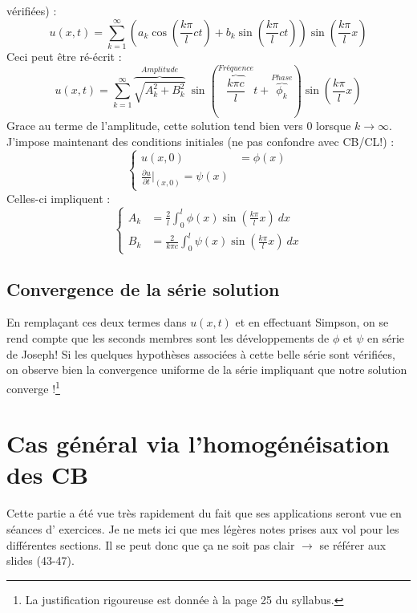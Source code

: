 \documentclass	[11pt, a4paper, openany]{book}
\newcommand{\serie}{\sum_{k=1}^\infty}
\begin{document}
				vérifiées) :
				\begin{equation}
					u(x,t) = \serie\left(a_k\cos\left(\frac{k\pi}{l}ct\right)+b_k\sin\left(\frac{k\pi}{l}ct\right)
					\right)\sin\left(\frac{k\pi}{l}x\right)
				\end{equation}
				Ceci peut être ré-écrit :
				\begin{equation}
					u(x,t) = \serie \overbrace{\sqrt{A_k^2 + B_k^2}}^{Amplitude}\ \sin\left(\overbrace{
						\frac{k\pi c}{l}}^{Fréquence}t +\overbrace{\phi_k}^{Phase}\right)\sin\left(\frac{k\pi}{l}
					x\right)
				\end{equation}
				Grace au terme de l'amplitude, cette solution tend bien vers 0 lorsque $k\rightarrow\infty$.\\
				J'impose maintenant des conditions initiales (ne pas confondre avec CB/CL!) :
				\begin{equation}
					\left\{\begin{array}{ll}
					u(x,0) &= \phi(x)\\
					\frac{\partial u}{\partial t}|_{(x,0)} = \psi(x)
					\end{array}\right.
				\end{equation}
				Celles-ci impliquent :
				\begin{equation}
					\left\{\begin{array}{ll}
					A_k &= \frac{2}{l}\int_0^l \phi(x)\sin\left(\frac{k\pi}{l}x\right)\ dx\\
					B_k &= \frac{2}{k\pi c}\int_0^l \psi(x)\sin\left(\frac{k\pi}{l}x\right)\ dx
					\end{array}\right.
				\end{equation}
					
				\subsection{Convergence de la série solution}
				En remplaçant ces deux termes dans $u(x,t)$ et en effectuant Simpson, on se rend compte 
				que les seconds membres sont les développements de $\phi$ et $\psi$ en série de Joseph! 
				Si les quelques hypothèses associées à cette belle série sont vérifiées, on observe bien
				la convergence uniforme de la série impliquant que notre solution converge !\footnote{
				La justification rigoureuse est donnée à la page 25 du syllabus.}
					
				
				
				\section{Cas général via l'homogénéisation des CB}
				Cette partie a été vue très rapidement du fait que ses applications seront vue en séances d'
				exercices. Je ne mets ici que mes légères notes prises aux vol pour les différentes sections.
				Il se peut donc que ça ne soit pas clair $\rightarrow$ se référer aux slides (43-47).
				
\end{document}
